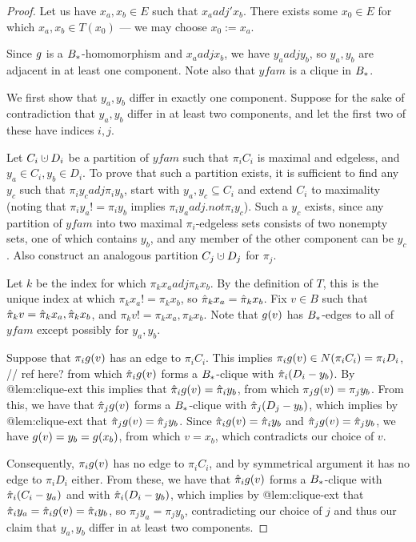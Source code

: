 \documentclass{amsart}
\theoremstyle{definition}
\newcommand{\cupdot}{\mathbin{\mathaccent\cdot\cup}}
\begin{document}
\begin{proof}
    Let us have $x_a, x_b \in E$ such that $x_a adj' x_b$. There exists some $x_0 \in E$ for which $x_a, x_b \in T(x_0)$ --- we may choose $x_0 := x_a$.

    Since $g$ is a $B_*$-homomorphism and $x_a adj x_b$, we have $y_a adj y_b$, so $y_a, y_b$ are adjacent in at least one component. Note also that $yfam$ is a clique in $B_*$.
  
    We first show that $y_a, y_b$ differ in exactly one component.
    Suppose for the sake of contradiction that $y_a, y_b$ differ in at least two components, and let the first two of these have indices $i, j$.
  
    Let $C_i \cupdot D_i$ be a partition of $yfam$ such that $\pi_i C_i$ is maximal and edgeless, and $y_a \in C_i, y_b \in D_i$. To prove that such a partition exists, it is sufficient to find any $y_c$ such that $\pi_i y_c adj \pi_i y_b$, start with ${y_a, y_c} \subseteq C_i$ and extend $C_i$ to maximality (noting that $\pi_i y_a != \pi_i y_b$ implies $\pi_i y_a adj.not \pi_i y_c$). Such a $y_c$ exists, since any partition of $yfam$ into two maximal $\pi_i$‑edgeless sets consists of two nonempty sets, one of which contains $y_b$, and any member of the other component can be $y_c$.
    Also construct an analogous partition $C_j \cupdot D_j$ for $\pi_j$.
  
    Let $k$ be the index for which $\pi_k x_a adj \pi_k x_b$. By the definition of $T$, this is the unique index at which $\pi_k x_a != \pi_k x_b$, so $\hat{\pi}_k x_a = \hat{\pi}_k x_b$. Fix $v \in B$ such
    that $\hat{\pi}_k v = \hat{\pi}_k x_a, \hat{\pi}_k x_b$, and $\pi_k v != \pi_k x_a, \pi_k x_b$. Note that $g(v)$ has $B_*$-edges to all of $yfam$ except possibly for $y_a, y_b$.
  
    Suppose that $\pi_i g(v)$ has an edge to $\pi_i C_i$. This implies $\pi_i g(v) \in N(\pi_i C_i) = \pi_i D_i$,
    // ref here?
    from which $\hat{\pi}_i g(v)$ forms a $B_*$-clique with $\hat{\pi}_i (D_i - {y_b})$. By @lem:clique-ext this implies that $\hat{\pi}_i g(v) = \hat{\pi}_i y_b$, from which $\pi_j g(v) = \pi_j y_b$. From this, we have that $\hat{\pi}_j g(v)$ forms a $B_*$-clique with $\hat{\pi}_j (D_j - {y_b})$, which implies by @lem:clique-ext that $\hat{\pi}_j g(v) = \hat{\pi}_j y_b$. Since $\hat{\pi}_i g(v) = \hat{\pi}_i y_b$ and $\hat{\pi}_j g(v) = \hat{\pi}_j y_b$, we have $g(v) = y_b = g(x_b)$, from which $v = x_b$, which contradicts our choice of $v$.
  
    Consequently, $\pi_i g(v)$ has no edge to $\pi_i C_i$, and by symmetrical argument it has no edge to $\pi_i D_i$ either. From these, we have that $\hat{\pi}_i g(v)$ forms a $B_*$-clique with $\hat{\pi}_i (C_i - {y_a})$ and with $\hat{\pi}_i (D_i - {y_b})$, which implies by @lem:clique-ext that $\hat{\pi}_i y_a = \hat{\pi}_i g(v) = \hat{\pi}_i y_b$, so $\pi_j y_a = \pi_j y_b$, contradicting our choice of $j$ and thus our claim that $y_a, y_b$ differ in at least two components.
  

\end{proof}
\end{document}
